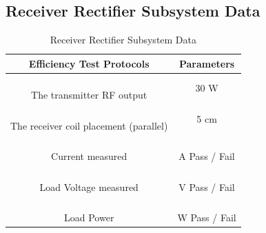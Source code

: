 \documentclass[12pt]{article}
\begin{document}
\begin{appendices}
\subsection{Receiver Rectifier Subsystem Data}

\begin{table}[h!]
\centering
\caption*{Receiver Rectifier Subsystem Data}
\begin{tabular}{ | c | c | }
\hline
\textbf{Efficiency Test Protocols} & \textbf{Parameters} \\
\hline
\parbox{0.5\linewidth}{\raggedright \hfill \\[-0.25 em]
The transmitter RF output
 \hfill \\[0.1 em]} & 
 30 W\\
\hline
\parbox{0.5\linewidth}{\raggedright \hfill \\[-0.25 em]
The receiver coil placement (parallel)
\hfill \\[0.1 em]} & 
5 cm\\
\hline
\parbox{0.5\linewidth}{\raggedright \hfill \\[-0.25 em]
Current measured
\hfill \\[0.1 em]} &  \parbox{0.4\linewidth}{\raggedright \hfill \\ [0.7 em] \underline{\hspace{0.625in}} 
A 
\hspace{0.125 in}Pass \space / \space  Fail \hfill \\ [0.3 em]} \\ 
\hline
\parbox{0.5\linewidth}{\raggedright \hfill \\[-0.25 em]
Load Voltage measured
\hfill \\[0.1 em]} &  \parbox{0.4\linewidth}{\raggedright \hfill \\ [0.7 em]\underline{\hspace{0.625in}} 
V  
\hspace{0.125 in}Pass \space / \space  Fail \hfill \\ [0.3 em]} \\ 
\hline
\parbox{0.5\linewidth}{\raggedright \hfill \\[-0.25 em]
Load Power
\hfill \\[0.1 em]} &  \parbox{0.4\linewidth}{\raggedright \hfill \\ [0.7 em]\underline{\hspace{0.625in}} 
W
\hspace{0.125 in}Pass \space / \space  Fail \hfill \\ [0.3 em]} \\ 

\end{tabular}
\end{table}
\end{appendices}
\end{document}
